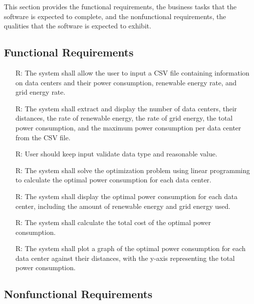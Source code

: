 \documentclass[12pt]{article}
\newcounter{reqnum} %
\begin{document}
This section provides the functional requirements, the business tasks that the
software is expected to complete, and the nonfunctional requirements, the
qualities that the software is expected to exhibit.

\subsection{Functional Requirements}

\noindent \begin{itemize}

\item[R\refstepcounter{reqnum}\thereqnum \label{R_Inputs}:] {The system shall allow the user to input a CSV file containing information on data centers and their power consumption, renewable energy rate, and grid energy rate.}

\item[R\refstepcounter{reqnum}\thereqnum \label{R_OutputInputs}:] {The system shall extract and display the number of data centers, their distances, the rate of renewable energy, the rate of grid energy, the total power consumption, and the maximum power consumption per data center from the CSV file.}

\item[R\refstepcounter{reqnum}\thereqnum \label{R_Calculate}:] {User should keep input validate data type and reasonable value.}

\item[R\refstepcounter{reqnum}\thereqnum \label{R_VerifyOutput}:]
  {The system shall solve the optimization problem using linear programming to calculate the optimal power consumption for each data center.}

\item[R\refstepcounter{reqnum}\thereqnum \label{R_Output}:] {The system shall display the optimal power consumption for each data center, including the amount of renewable energy and grid energy used.}
\item[R\refstepcounter{reqnum}\thereqnum \label{R_VerifyOutput}:]
  {The system shall calculate the total cost of the optimal power consumption.}
  \item[R\refstepcounter{reqnum}\thereqnum \label{R_VerifyOutput}:]
  {The system shall plot a graph of the optimal power consumption for each data center against their distances, with the y-axis representing the total power consumption.}
\end{itemize}


\subsection{Nonfunctional Requirements}
\end{document}
